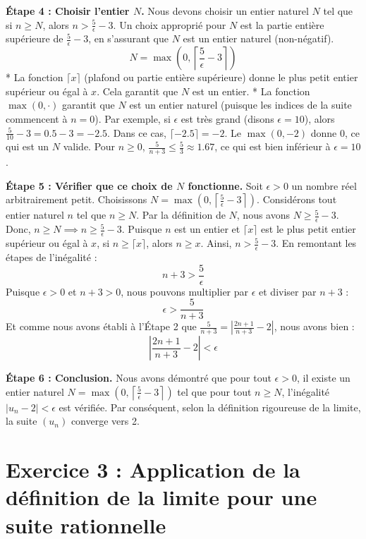 \documentclass[a4paper,11pt]{report}
\begin{document}
\textbf{Étape 4 : Choisir l'entier $N$.}
Nous devons choisir un entier naturel $N$ tel que si $n \ge N$, alors $n > \frac{5}{\epsilon} - 3$.
Un choix approprié pour $N$ est la partie entière supérieure de $\frac{5}{\epsilon} - 3$, en s'assurant que $N$ est un entier naturel (non-négatif).
$$ N = \max\left(0, \left\lceil \frac{5}{\epsilon} - 3 \right\rceil\right) $$
*   La fonction $\lceil x \rceil$ (plafond ou partie entière supérieure) donne le plus petit entier supérieur ou égal à $x$. Cela garantit que $N$ est un entier.
*   La fonction $\max(0, \cdot)$ garantit que $N$ est un entier naturel (puisque les indices de la suite commencent à $n=0$). Par exemple, si $\epsilon$ est très grand (disons $\epsilon=10$), alors $\frac{5}{10} - 3 = 0.5 - 3 = -2.5$. Dans ce cas, $\lceil -2.5 \rceil = -2$. Le $\max(0, -2)$ donne $0$, ce qui est un $N$ valide. Pour $n \ge 0$, $\frac{5}{n+3} \le \frac{5}{3} \approx 1.67$, ce qui est bien inférieur à $\epsilon=10$.

\textbf{Étape 5 : Vérifier que ce choix de $N$ fonctionne.}
Soit $\epsilon > 0$ un nombre réel arbitrairement petit.
Choisissons $N = \max\left(0, \left\lceil \frac{5}{\epsilon} - 3 \right\rceil\right)$.
Considérons tout entier naturel $n$ tel que $n \ge N$.
Par la définition de $N$, nous avons $N \ge \frac{5}{\epsilon} - 3$.
Donc, $n \ge N \implies n \ge \frac{5}{\epsilon} - 3$.
Puisque $n$ est un entier et $\lceil x \rceil$ est le plus petit entier supérieur ou égal à $x$, si $n \ge \lceil x \rceil$, alors $n \ge x$.
Ainsi, $n > \frac{5}{\epsilon} - 3$.
En remontant les étapes de l'inégalité :
$$ n+3 > \frac{5}{\epsilon} $$
Puisque $\epsilon > 0$ et $n+3 > 0$, nous pouvons multiplier par $\epsilon$ et diviser par $n+3$ :
$$ \epsilon > \frac{5}{n+3} $$
Et comme nous avons établi à l'Étape 2 que $\frac{5}{n+3} = \left| \frac{2n+1}{n+3} - 2 \right|$, nous avons bien :
$$ \left| \frac{2n+1}{n+3} - 2 \right| < \epsilon $$

\textbf{Étape 6 : Conclusion.}
Nous avons démontré que pour tout $\epsilon > 0$, il existe un entier naturel $N = \max\left(0, \left\lceil \frac{5}{\epsilon} - 3 \right\rceil\right)$ tel que pour tout $n \ge N$, l'inégalité $|u_n - 2| < \epsilon$ est vérifiée.
Par conséquent, selon la définition rigoureuse de la limite, la suite $(u_n)$ converge vers 2.

\vspace{1cm}

\section*{Exercice 3 : Application de la définition de la limite pour une suite rationnelle}
\end{document}
